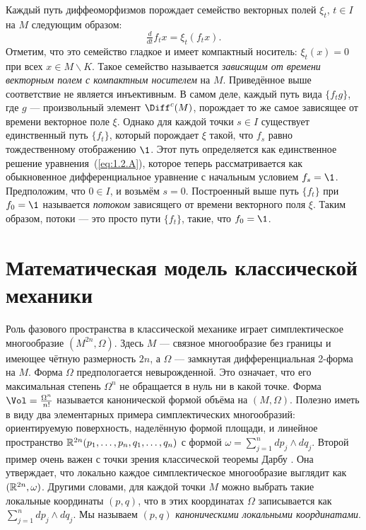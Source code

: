 Каждый путь диффеоморфизмов порождает семейство векторных полей $\xi_t$, $t \in I$ на $M$ следующим образом: 
\begin{equation}\tfrac{d}{dt} f_t x = \xi_t (f_t x).
\label{eq:1.2.A}
\end{equation}
Отметим, что это семейство гладкое и имеет компактный носитель: $\xi_t (x) = 0$ при всех $x \in M \backslash K$.
Такое семейство называется \emph{зависящим от времени векторным полем с компактным носителем} на $M$.
Приведённое выше соответствие не является инъективным.
В самом деле, каждый путь вида $\{f_t g\}$, где $g$ --- произвольный элемент $\Diff^c (M)$, порождает то же самое зависящее от времени векторное поле $\xi$.
Однако для каждой точки $s \in I$ существует единственный путь $\{f_t\}$, который 
порождает $\xi$ такой, что $f_s$ равно тождественному отображению $\1$.
Этот путь определяется как единственное решение уравнения~(\ref{eq:1.2.A}), которое теперь рассматривается как обыкновенное дифференциальное уравнение с начальным условием $f_s = \1$.
Предположим, что $0 \in I$, и возьмём $s = 0$.
Построенный выше путь $\{f_t\}$ при $f_0 = \1$ называется \emph{потоком} зависящего от времени векторного поля $\xi$.
Таким образом, потоки --- это просто пути $\{f_t\}$, такие, что $f_0 = \1$.

\section{Математическая модель классической механики}

Роль фазового пространства в классической механике играет симплектическое многообразие $(M^{2n},\Omega)$.
Здесь $M$ --- связное многообразие без границы и имеющее чётную размерность $2n$, а $\Omega$ --- замкнутая дифференциальная 2-форма на $M$.
Форма $\Omega$ предпологается невырожденной.
Это означает, что его максимальная степень $\Omega^n$ не обращается в нуль ни в какой точке.
Форма $\Vol =  \tfrac{\Omega^n}{n!}$ называется канонической формой объёма на $(M, \Omega)$.
Полезно иметь в виду два элементарных примера симплектических многообразий:
ориентируемую поверхность, наделённую формой площади, и линейное пространство $\mathbb{R}^{2n} (p_1,\dots, p_n, q_1,\dots, q_n)$ с формой $\omega = \sum^n_{j = 1} dp_j \wedge dq_j$.
Второй пример очень важен с точки зрения классической теоремы Дарбу \cite{MS}.
Она утверждает, что локально каждое симплектическое многообразие выглядит как $(\mathbb{R}^{2n}, \omega)$.
Другими словами, для каждой точки $M$ можно выбрать такие локальные координаты $(p, q)$, что в этих координатах $\Omega$ записывается как $\sum^n_{j = 1} dp_j \wedge dq_j$.
Мы называем $(p, q)$ \emph{каноническими локальными координатами}.

